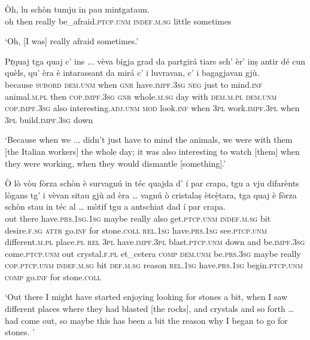 \begin{linenumbers}
\gll  Òh, lu schòn tumju in pau mintgataun.  \\
oh then really be\_afraid.\textsc{ptcp.unm} \textsc{indef.m.sg} little sometimes  \\
\end{linenumbers}
\medskip
\glt `Oh, [I was] really afraid sometimes.'
\medskip

\begin{linenumbers}
\gll  Pr̩quaj tga quaj c’ ins ... vèva bigja grad da partgirá tiars sch’ èr’ inṣ antir dé cun quèls, qu' èra è intarassant da mirá c’ i luvravan, c' i bagagjavan gjù.  \\
because \textsc{subord} \textsc{dem.unm} when \textsc{gnr} {} have.\textsc{impf.3sg}  \textsc{neg} just to mind.\textsc{inf} animal.\textsc{m.pl} then \textsc{cop.impf.3sg} \textsc{gnr} whole.\textsc{m.sg} day with \textsc{dem.m.pl} \textsc{dem.unm} \textsc{cop.impf.3sg} also interesting.\textsc{adj.unm} \textsc{mod} look.\textsc{inf} when \textsc{3pl} work.\textsc{impf.3pl} when \textsc{3pl} build.\textsc{impf.3sg} down\\
\end{linenumbers}
\medskip
\glt `Because when we ... didn’t just have to mind the animals, we were with them [the Italian workers] the whole day; it was also interesting to watch [them] when they were working, when they would dismantle [something].'
\medskip

\begin{linenumbers}
\gll  Ò lò vòu fòrza schòn è survagnú in téc quajda d' í par crapa, tgu a vju difarènts lògans tg’ i vèvan sitau gjù ad èra … vagnú ò cristalaṣ ètcè̱tara, tga quaj è fòrza schòn stau in téc al … mòtif tgu a antschiat dad í par crapa.   \\
out there  have.\textsc{prs.1sg.1sg} maybe really also get.\textsc{ptcp.unm} \textsc{indef.m.sg} bit desire.\textsc{f.sg} \textsc{attr} go.\textsc{inf} for stone.\textsc{coll} \textsc{rel.1sg} have.\textsc{prs.1sg} see.\textsc{ptcp.unm} different.\textsc{m.pl} place.\textsc{pl} \textsc{rel} \textsc{3pl} have.\textsc{impf.3pl} blast.\textsc{ptcp.unm} down and be.\textsc{impf.3sg} {} come.\textsc{ptcp.unm} out crystal.\textsc{f.pl} et\_cetera \textsc{comp} \textsc{dem.unm} be.\textsc{prs.3sg} maybe really  \textsc{cop.ptcp.unm} \textsc{indef.m.sg} bit \textsc{def.m.sg} {} reason \textsc{rel.1sg} have.\textsc{prs.1sg} begin.\textsc{ptcp.unm} \textsc{comp} go.\textsc{inf} for stone.\textsc{coll}\\
\end{linenumbers}
\medskip
\glt `Out there I might have started enjoying looking for stones a bit, when I saw different places where they had blasted [the rocks], and crystals and so forth … had come out, so maybe this has been a bit the reason why I began to go for stones. '
\medskip

